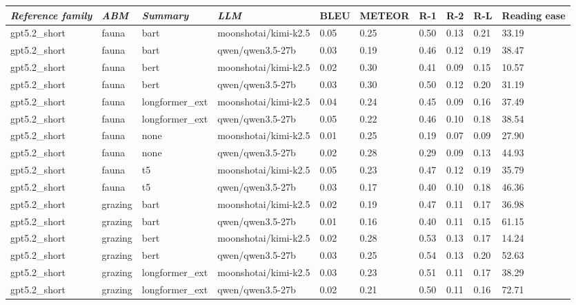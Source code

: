 \begin{tabular}{|l|l|l|l|l|l|l|l|l|l|}
\hline
\textit{\textbf{Reference family}} & \textit{\textbf{ABM}} & \textit{\textbf{Summary}} & \textit{\textbf{LLM}} & BLEU & METEOR & R-1 & R-2 & R-L & Reading ease \\
 \hline
 gpt5.2\_short & fauna & bart & moonshotai/kimi-k2.5 & 0.05 & 0.25 & 0.50 & 0.13 & 0.21 & 33.19 \\
 \hline
 gpt5.2\_short & fauna & bart & qwen/qwen3.5-27b & 0.03 & 0.19 & 0.46 & 0.12 & 0.19 & 38.47 \\
 \hline
 gpt5.2\_short & fauna & bert & moonshotai/kimi-k2.5 & 0.02 & 0.30 & 0.41 & 0.09 & 0.15 & 10.57 \\
 \hline
 gpt5.2\_short & fauna & bert & qwen/qwen3.5-27b & 0.03 & 0.30 & 0.50 & 0.12 & 0.20 & 31.19 \\
 \hline
 gpt5.2\_short & fauna & longformer\_ext & moonshotai/kimi-k2.5 & 0.04 & 0.24 & 0.45 & 0.09 & 0.16 & 37.49 \\
 \hline
 gpt5.2\_short & fauna & longformer\_ext & qwen/qwen3.5-27b & 0.05 & 0.22 & 0.46 & 0.10 & 0.18 & 38.54 \\
 \hline
 gpt5.2\_short & fauna & none & moonshotai/kimi-k2.5 & 0.01 & 0.25 & 0.19 & 0.07 & 0.09 & 27.90 \\
 \hline
 gpt5.2\_short & fauna & none & qwen/qwen3.5-27b & 0.02 & 0.28 & 0.29 & 0.09 & 0.13 & 44.93 \\
 \hline
 gpt5.2\_short & fauna & t5 & moonshotai/kimi-k2.5 & 0.05 & 0.23 & 0.47 & 0.12 & 0.19 & 35.79 \\
 \hline
 gpt5.2\_short & fauna & t5 & qwen/qwen3.5-27b & 0.03 & 0.17 & 0.40 & 0.10 & 0.18 & 46.36 \\
 \hline
 gpt5.2\_short & grazing & bart & moonshotai/kimi-k2.5 & 0.02 & 0.19 & 0.47 & 0.11 & 0.17 & 36.98 \\
 \hline
 gpt5.2\_short & grazing & bart & qwen/qwen3.5-27b & 0.01 & 0.16 & 0.40 & 0.11 & 0.15 & 61.15 \\
 \hline
 gpt5.2\_short & grazing & bert & moonshotai/kimi-k2.5 & 0.02 & 0.28 & 0.53 & 0.13 & 0.17 & 14.24 \\
 \hline
 gpt5.2\_short & grazing & bert & qwen/qwen3.5-27b & 0.03 & 0.25 & 0.54 & 0.13 & 0.20 & 52.63 \\
 \hline
 gpt5.2\_short & grazing & longformer\_ext & moonshotai/kimi-k2.5 & 0.03 & 0.23 & 0.51 & 0.11 & 0.17 & 38.29 \\
 \hline
 gpt5.2\_short & grazing & longformer\_ext & qwen/qwen3.5-27b & 0.02 & 0.21 & 0.50 & 0.11 & 0.16 & 72.71 \\

\end{tabular}
